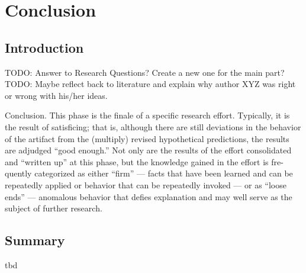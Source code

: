 
\chapter{Conclusion}

\label{ChapterConclusion}


\section{Introduction}

TODO: Answer to Research Questions? Create a new one for the main part?
TODO: Maybe reflect back to literature and explain why author XYZ was right or wrong with his/her ideas.

Conclusion. This phase is the finale of a specific research effort. Typically, it is the result of satisficing; that is, although there are still deviations in the behavior of the artifact from the (multiply) revised hypothetical predictions, the results are adjudged “good enough.” Not only are the results of the effort consolidated and “written up” at this phase, but the knowledge gained in the effort is fre- quently categorized as either “firm” — facts that have been learned and can be repeatedly applied or behavior that can be repeatedly invoked — or as “loose ends” — anomalous behavior that defies explanation and may well serve as the subject of further research.
\cite{Vaishnavi2008}




\section{Summary}

tbd




